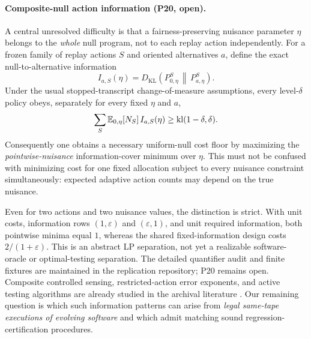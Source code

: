 \paragraph{Composite-null action information (P20, open).}
A central unresolved difficulty is that a fairness-preserving nuisance parameter
$\eta$ belongs to the \emph{whole} null program, not to each replay action
independently. For a frozen family of replay actions $S$ and oriented
alternatives $a$, define the exact null-to-alternative information
\begin{equation}\label{eq:appendix-07-open-problems-015}
I_{a,S}(\eta)
=
D_{\mathrm{KL}}\!\left(
P_{0,\eta}^{S}\,\middle\|\,P_{a,\eta}^{S}
\right).
\end{equation}
Under the usual stopped-transcript change-of-measure assumptions, every
level-$\delta$ policy obeys, separately for every fixed $\eta$ and $a$,
\begin{equation}\label{eq:appendix-07-open-problems-016}
\sum_S
\mathbb{E}_{0,\eta}[N_S]\,I_{a,S}(\eta)
\ge
\mathrm{kl}(1-\delta,\delta).
\end{equation}
Consequently one obtains a necessary uniform-null cost floor by maximizing
the \emph{pointwise-nuisance} information-cover minimum over $\eta$.
This must not be confused with minimizing cost for one fixed allocation
subject to every nuisance constraint simultaneously: expected adaptive
action counts may depend on the true nuisance.

Even for two actions and two nuisance values, the distinction is strict.
With unit costs, information rows $(1,\varepsilon)$ and
$(\varepsilon,1)$, and unit required information, both pointwise
minima equal $1$, whereas the shared fixed-information design costs
$2/(1+\varepsilon)$. This is an abstract LP separation, not yet a
realizable software-oracle or optimal-testing separation.
The detailed quantifier audit and finite fixtures are maintained in the
replication repository; P20 remains open. Composite controlled sensing,
restricted-action error exponents, and active testing algorithms are already
studied in the archival literature
\cite{DeshmukhVeeravalliBhashyam2021,HsuWang2025,GanJiaLiTayur2026}.
Our remaining question is which such information patterns can arise from
\emph{legal same-tape executions of evolving software} and which admit
matching sound regression-certification procedures.

